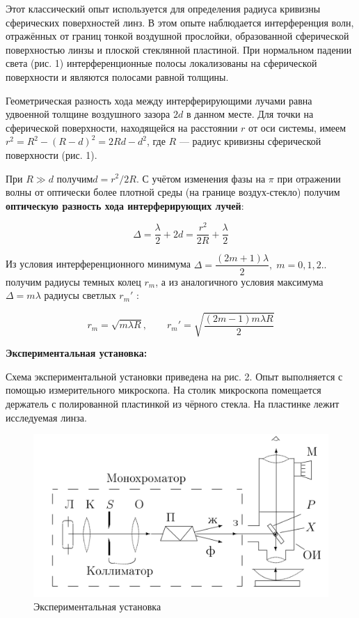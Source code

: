 \documentclass[a4paper, 12pt]{article}%
\begin{document}
Этот классический опыт используется для определения радиуса кривизны сферических поверхностей линз. В этом опыте наблюдается интерференция волн, отражённых от границ тонкой воздушной прослойки, образованной сферической поверхностью линзы и плоской стеклянной пластиной. При нормальном падении света (рис. 1) интерференционные полосы локализованы на сферической поверхности и являются полосами равной толщины.

Геометрическая разность хода между интерферирующими лучами равна удвоенной толщине воздушного зазора $ 2d $ в данном месте. Для точки на сферической поверхности, находящейся на расстоянии $ r $ от оси системы, имеем $ r^2 = R^2 - (R - d)^2 = 2Rd - d^2 $, где $ R $ --- радиус кривизны сферической поверхности (рис. 1).

При $ R \gg d $ получим$  d = r^2/2R $. С учётом изменения фазы на $ \pi $ при отражении волны от оптически более плотной среды (на границе воздух-стекло) получим \textbf{оптическую разность хода интерферирующих лучей}:

\begin{equation}\label{r_m}
	\Delta = \dfrac{\lambda}{2} + 2d = \dfrac{r^2}{2R} + \dfrac{\lambda}{2}
\end{equation}

Из условия интерференционного минимума $ \Delta = \dfrac{(2m +1)\lambda}{2}, \; m =0, 1, 2.. $ получим радиусы темных колец $ r_m $, а из аналогичного условия максимума $ \Delta = m \lambda $ радиусы светлых $ r_m' $ :

\begin{equation}\label{r_m'}
	r_m = \sqrt{m \lambda R}, \qquad 	r_m' = \sqrt{\dfrac{(2m-1)m \lambda R}{2}}
\end{equation}

\textbf{Экспериментальная установка:}

Схема экспериментальной установки приведена на рис. 2. Опыт выполняется с помощью измерительного микроскопа.
На столик микроскопа помещается держатель с полированной пластинкой из
чёрного стекла. На пластинке лежит исследуемая линза.

\begin{figure}[H]
	\begin{center}
		\includegraphics[width=0.6\linewidth]{Lab.png}
		\caption{Экспериментальная установка}
	\end{center}
\end{figure}
\end{document}
